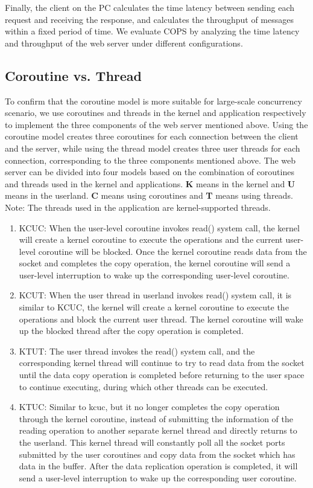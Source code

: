 \documentclass[sigconf,review,anonymous]{acmart}
\begin{document}
Finally, the client on the PC calculates the time latency between sending each request and receiving the response, and calculates the throughput of messages within a fixed period of time. We evaluate COPS by analyzing the time latency and throughput of the web server under different configurations.

\subsection{Coroutine vs. Thread}

To confirm that the coroutine model is more suitable for large-scale concurrency scenario, we use coroutines and threads in the kernel and application respectively to implement the three components of the web server mentioned above. Using the coroutine model creates three coroutines for each connection between the client and the server, while using the thread model creates three user threads for each connection, corresponding to the three components mentioned above. The web server can be divided into four models based on the combination of coroutines and threads used in the kernel and applications. \textbf{K} means in the kernel and \textbf{U} means in the userland. \textbf{C} means using coroutines and \textbf{T} means using threads. Note: The threads used in the application are kernel-supported threads. 

\begin{enumerate}[leftmargin=*]
    \item KCUC: When the user-level coroutine invokes read() system call, the kernel will create a kernel coroutine to execute the operations and the current user-level coroutine will be blocked. Once the kernel coroutine reads data from the socket and completes the copy operation, the kernel coroutine will send a user-level interruption to wake up the corresponding user-level coroutine.
    \item KCUT: When the user thread in userland invokes read() system call, it is similar to KCUC, the kernel will create a kernel coroutine to execute the operations and block the current user thread. The kernel coroutine will wake up the blocked thread after the copy operation is completed.
    \item KTUT: The user thread invokes the read() system call, and the corresponding kernel thread will continue to try to read data from the socket until the data copy operation is completed before returning to the user space to continue executing, during which other threads can be executed.
    \item KTUC: Similar to kcuc, but it no longer completes the copy operation through the kernel coroutine, instead of submitting the information of the reading operation to another separate kernel thread and directly returns to the userland. This kernel thread will constantly poll all the socket ports submitted by the user coroutines and copy data from the socket which has data in the buffer. After the data replication operation is completed, it will send a user-level interruption to wake up the corresponding user coroutine.
\end{enumerate}
\end{document}
